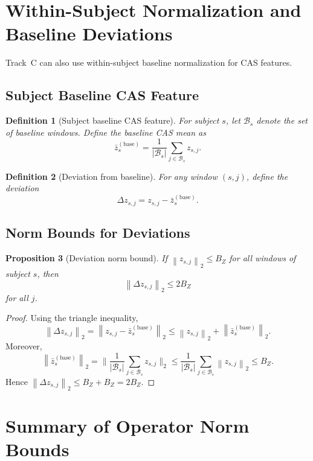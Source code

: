 \documentclass[11pt]{article}
\newtheorem{definition}{Definition}[section]
\newtheorem{proposition}[definition]{Proposition}
\newcommand{\norm}[1]{\left\lVert #1 \right\rVert}
\newcommand{\abs}[1]{\left\lvert #1 \right\rvert}
\begin{document}
\section{Within-Subject Normalization and Baseline Deviations}

Track~C can also use within-subject baseline normalization for CAS features.

\subsection{Subject Baseline CAS Feature}

\begin{definition}[Subject baseline CAS feature]
For subject \(s\), let \(\mathcal{B}_s\) denote the set of baseline windows.
Define the baseline CAS mean as
\[
  \bar{z}_s^{(\mathrm{base})}
  = \frac{1}{\abs{\mathcal{B}_s}} \sum_{j \in \mathcal{B}_s} z_{s,j}.
\]
\end{definition}

\begin{definition}[Deviation from baseline]
For any window \((s,j)\), define the deviation
\[
  \Delta z_{s,j} = z_{s,j} - \bar{z}_s^{(\mathrm{base})}.
\]
\end{definition}

\subsection{Norm Bounds for Deviations}

\begin{proposition}[Deviation norm bound]
If \(\norm{z_{s,j}}_2 \le B_Z\) for all windows of subject \(s\), then
\[
  \norm{\Delta z_{s,j}}_2 \le 2 B_Z
\]
for all \(j\).
\end{proposition}

\begin{proof}
Using the triangle inequality,
\[
  \norm{\Delta z_{s,j}}_2
  = \norm{z_{s,j} - \bar{z}_s^{(\mathrm{base})}}_2
  \le \norm{z_{s,j}}_2 + \norm{\bar{z}_s^{(\mathrm{base})}}_2.
\]
Moreover,
\[
  \norm{\bar{z}_s^{(\mathrm{base})}}_2
  = \biggl\lVert \frac{1}{\abs{\mathcal{B}_s}} \sum_{j \in \mathcal{B}_s} z_{s,j} \biggr\rVert_2
  \le \frac{1}{\abs{\mathcal{B}_s}} \sum_{j \in \mathcal{B}_s} \norm{z_{s,j}}_2
  \le B_Z.
\]
Hence \(\norm{\Delta z_{s,j}}_2 \le B_Z + B_Z = 2 B_Z\).
\end{proof}

\section{Summary of Operator Norm Bounds}
\end{document}
